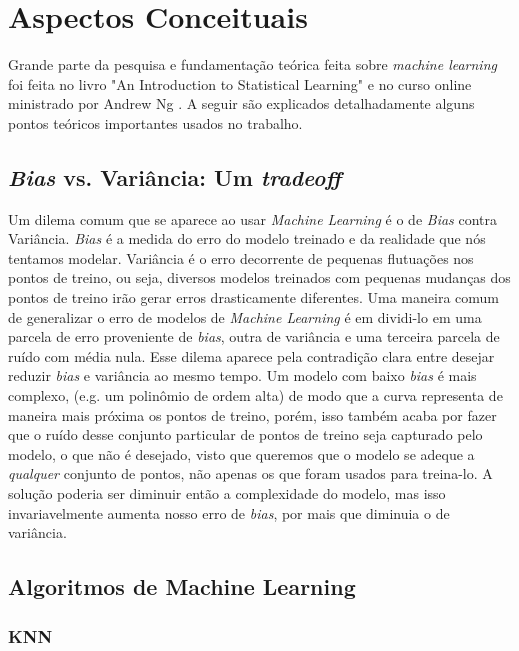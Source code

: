 
\chapter{Aspectos Conceituais}\label{chp:fc}


Grande parte da pesquisa e fundamentação teórica feita sobre \textit{machine learning} foi feita no livro "An Introduction to Statistical Learning" \cite{statbook} e no curso online ministrado por Andrew Ng \cite{coursera}. A seguir são explicados detalhadamente alguns pontos teóricos importantes usados no trabalho.




\section{\textit{Bias} vs. Variância: Um \textit{tradeoff} }


Um dilema comum que se aparece ao usar \textit{Machine Learning} é o de \textit{Bias} contra Variância. \textit{Bias} é a medida do erro do modelo treinado e da realidade que nós tentamos modelar. Variância é o erro decorrente de pequenas flutuações nos pontos de treino, ou seja, diversos modelos treinados com pequenas mudanças dos pontos de treino irão gerar erros drasticamente diferentes. Uma maneira comum de generalizar o erro de modelos de \textit{Machine Learning} é em dividi-lo em uma parcela de erro proveniente de \textit{bias}, outra de variância e uma terceira parcela de ruído com média nula. Esse dilema aparece pela contradição clara entre desejar reduzir \textit{bias} e variância ao mesmo tempo. Um modelo com baixo \textit{bias} é mais complexo, (e.g. um polinômio de ordem alta) de modo que a curva representa de maneira mais próxima os pontos de treino, porém, isso também acaba por fazer que o ruído desse conjunto particular de pontos de treino seja capturado pelo modelo, o que não é desejado, visto que queremos que o modelo se adeque a \textit{qualquer} conjunto de pontos, não apenas os que foram usados para treina-lo. A solução poderia ser diminuir então a complexidade do modelo, mas isso invariavelmente aumenta nosso erro de \textit{bias}, por mais que diminuia o de variância.


\section{Algoritmos de Machine Learning}

\subsection{KNN}


